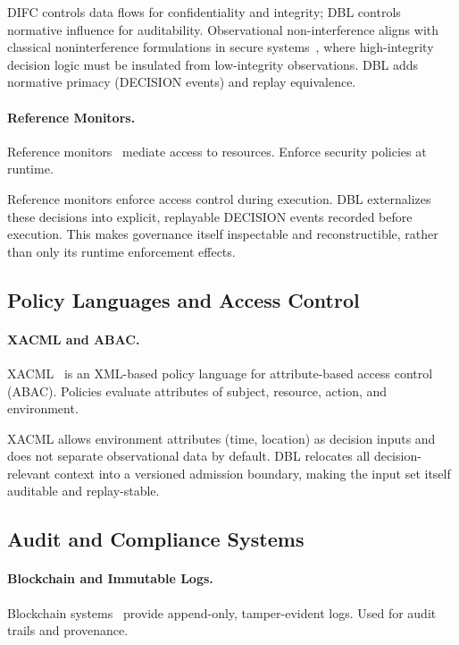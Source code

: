 DIFC controls data flows for confidentiality and integrity; DBL controls normative influence for auditability. Observational non-interference aligns with classical noninterference formulations in secure systems~\cite{goguen1982security,rushby1992noninterference}, where high-integrity decision logic must be insulated from low-integrity observations. DBL adds normative primacy (DECISION events) and replay equivalence.

\paragraph{Reference Monitors.}
Reference monitors~\cite{anderson1972reference} mediate access to resources. Enforce security policies at runtime.

Reference monitors enforce access control during execution. DBL externalizes these decisions into explicit, replayable DECISION events recorded before execution. This makes governance itself inspectable and reconstructible, rather than only its runtime enforcement effects.

\subsection{Policy Languages and Access Control}

\paragraph{XACML and ABAC.}
XACML~\cite{oasis2013xacml} is an XML-based policy language for attribute-based access control (ABAC). Policies evaluate attributes of subject, resource, action, and environment.

XACML allows environment attributes (time, location) as decision inputs and does not separate observational data by default. DBL relocates all decision-relevant context into a versioned admission boundary, making the input set itself auditable and replay-stable.

\subsection{Audit and Compliance Systems}

\paragraph{Blockchain and Immutable Logs.}
Blockchain systems~\cite{nakamoto2008bitcoin} provide append-only, tamper-evident logs. Used for audit trails and provenance.

